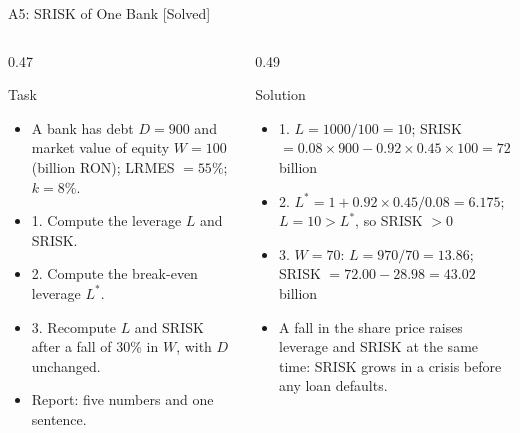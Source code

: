\begin{frame}{A5: SRISK of One Bank [Solved]}
\itemsize{\scriptsize}
\begin{columns}[T]
\begin{column}{0.47\textwidth}
\begin{block}{Task}
\begin{itemize}
    \item A bank has debt $D = 900$ and market value of equity $W = 100$ (billion RON); LRMES $= 55\%$; $k = 8\%$.
    \item 1. Compute the leverage $L$ and SRISK.
    \item 2. Compute the break-even leverage $L^*$.
    \item 3. Recompute $L$ and SRISK after a fall of 30\% in $W$, with $D$ unchanged.
    \item Report: five numbers and one sentence.
\end{itemize}
\end{block}
\end{column}
\begin{column}{0.49\textwidth}
\begin{exampleblock}{Solution}
\begin{itemize}
    \item 1. $L = 1000/100 = 10$; SRISK $= 0.08 \times 900 - 0.92 \times 0.45 \times 100 = 72.00 - 41.40 = 30.60$ billion
    \item 2. $L^* = 1 + 0.92 \times 0.45/0.08 = 6.175$; $L = 10 > L^*$, so SRISK $> 0$
    \item 3. $W = 70$: $L = 970/70 = 13.86$; SRISK $= 72.00 - 28.98 = 43.02$ billion
    \item A fall in the share price raises leverage and SRISK at the same time: SRISK grows in a crisis before any loan defaults.
\end{itemize}
\end{exampleblock}
\end{column}
\end{columns}
\end{frame}

